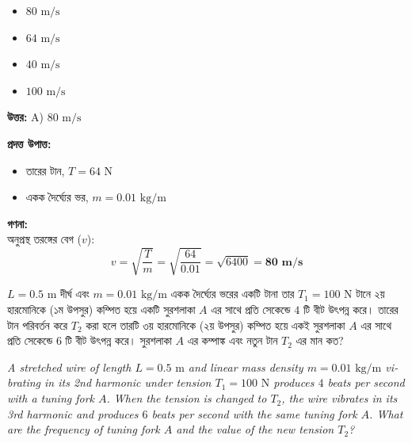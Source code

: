 \documentclass[12pt, a4paper]{article}
\begin{document}
\begin{itemize}[label={}, leftmargin=1cm, itemsep=0.5em]
    \item[\textbf{A)}] $80\text{ m/s}$
    \item[\textbf{B)}] $64\text{ m/s}$
    \item[\textbf{C)}] $40\text{ m/s}$
    \item[\textbf{D)}] $100\text{ m/s}$
\end{itemize}

\vspace{0.5em}
\begin{tcolorbox}[answerbox]
    \textbf{\color{success} উত্তর:} A) $80\text{ m/s}$
\end{tcolorbox}
\vspace{1em}

\begin{tcolorbox}[solutionbox={সমাধান (Solution)}]
    \noindent
    \textbf{প্রদত্ত উপাত্ত:}
    \begin{itemize}[leftmargin=1.5em, itemsep=0.2em]
        \item তারের টান, $T = 64\text{ N}$
        \item একক দৈর্ঘ্যের ভর, $m = 0.01\text{ kg/m}$
    \end{itemize}

    \vspace{0.6em}
    \noindent\textbf{গণনা:} \\
    অনুপ্রস্থ তরঙ্গের বেগ ($v$):
    \[ v = \sqrt{\frac{T}{m}} = \sqrt{\frac{64}{0.01}} = \sqrt{6400} = \mathbf{80\text{ m/s}} \]
\end{tcolorbox}

\begin{tcolorbox}[questionbox={প্রশ্ন (Question) 11}]
    \noindent
    $L = 0.5\text{ m}$ দীর্ঘ এবং $m = 0.01\text{ kg/m}$ একক দৈর্ঘ্যের ভরের একটি টানা তার $T_1 = 100\text{ N}$ টানে ২য় হারমোনিকে (১ম উপসুর) কম্পিত হয়ে একটি সুরশলাকা $A$ এর সাথে প্রতি সেকেন্ডে $4$ টি বীট উৎপন্ন করে। তারের টান পরিবর্তন করে $T_2$ করা হলে তারটি ৩য় হারমোনিকে (২য় উপসুর) কম্পিত হয়ে একই সুরশলাকা $A$ এর সাথে প্রতি সেকেন্ডে $6$ টি বীট উৎপন্ন করে। সুরশলাকা $A$ এর কম্পাঙ্ক এবং নতুন টান $T_2$ এর মান কত?
    
    \vspace{0.8em}
    \begin{english}
    \noindent\textit{\color{darkgray}
    A stretched wire of length $L = 0.5\text{ m}$ and linear mass density $m = 0.01\text{ kg/m}$ vibrating in its 2nd harmonic under tension $T_1 = 100\text{ N}$ produces $4$ beats per second with a tuning fork $A$. When the tension is changed to $T_2$, the wire vibrates in its 3rd harmonic and produces $6$ beats per second with the same tuning fork $A$. What are the frequency of tuning fork $A$ and the value of the new tension $T_2$?
    }
    \end{english}
\end{tcolorbox}
\end{document}
